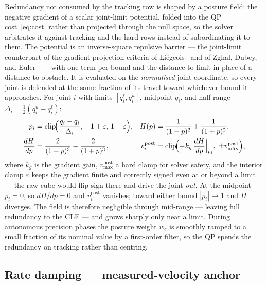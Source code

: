 \documentclass[12pt,a4paper,twoside,openright]{report}
\begin{document}
Redundancy not consumed by the tracking row is shaped by a posture field: the negative gradient of a scalar joint-limit potential, folded into the QP cost~\eqref{eq:cost} rather than projected through the null space, so the solver arbitrates it against tracking and the hard rows instead of subordinating it to them. The potential is an inverse-square repulsive barrier --- the joint-limit counterpart of the gradient-projection criteria of Li\'egeois~\cite{liegeois1977} and of Zghal, Dubey, and Euler~\cite{zghal1990} --- with one term per bound and the distance-to-limit in place of a distance-to-obstacle. It is evaluated on the \emph{normalised} joint coordinate, so every joint is defended at the same fraction of its travel toward whichever bound it approaches. For joint $i$ with limits $[q_i^{\ell}, q_i^{u}]$, midpoint $\bar{q}_i$, and half-range $\Delta_i = \tfrac{1}{2}(q_i^{u} - q_i^{\ell})$:
\begin{align}
p_i &= \operatorname{clip}\!\Bigl(\frac{q_i - \bar{q}_i}{\Delta_i},\, -1+\varepsilon,\, 1-\varepsilon\Bigr),
&
H(p) &= \frac{1}{(1-p)^2} + \frac{1}{(1+p)^2},
\\
\frac{dH}{dp} &= \frac{2}{(1-p)^3} - \frac{2}{(1+p)^3},
&
v_i^{\text{post}} &= \operatorname{clip}\!\Bigl(-k_g\,\frac{dH}{dp}\Big|_{p_i},\; \pm v_{\max}^{\text{post}}\Bigr),
\end{align}
where $k_g$ is the gradient gain, $v_{\max}^{\text{post}}$ a hard clamp for solver safety, and the interior clamp $\varepsilon$ keeps the gradient finite and correctly signed even at or beyond a limit --- the raw cube would flip sign there and drive the joint \emph{out}. At the midpoint $p_i = 0$, so $dH/dp = 0$ and $v_i^{\text{post}}$ vanishes; toward either bound $|p_i| \to 1$ and $H$ diverges. The field is therefore negligible through mid-range --- leaving full redundancy to the CLF --- and grows sharply only near a limit. During autonomous precision phases the posture weight $w_c$ is smoothly ramped to a small fraction of its nominal value by a first-order filter, so the QP spends the redundancy on tracking rather than centring.

\subsection{Rate damping --- measured-velocity anchor}
\label{sec:rate}
\end{document}
